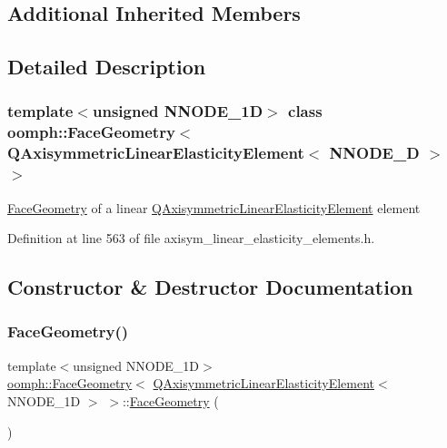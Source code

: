 \subsection*{Additional Inherited Members}


\subsection{Detailed Description}
\subsubsection*{template$<$unsigned N\+N\+O\+D\+E\+\_\+1D$>$\newline
class oomph\+::\+Face\+Geometry$<$ Q\+Axisymmetric\+Linear\+Elasticity\+Element$<$ N\+N\+O\+D\+E\+\_\+D $>$ $>$}

\hyperlink{classoomph_1_1FaceGeometry}{Face\+Geometry} of a linear \hyperlink{classoomph_1_1QAxisymmetricLinearElasticityElement}{Q\+Axisymmetric\+Linear\+Elasticity\+Element} element 

Definition at line 563 of file axisym\+\_\+linear\+\_\+elasticity\+\_\+elements.\+h.



\subsection{Constructor \& Destructor Documentation}
\mbox{\label{classoomph_1_1FaceGeometry_3_01QAxisymmetricLinearElasticityElement_3_01NNODE__1D_01_4_01_4_ab21305bb47d99ed60198556c06a856a7}} 
\subsubsection{\texorpdfstring{Face\+Geometry()}{FaceGeometry()}}
{\footnotesize\ttfamily template$<$unsigned N\+N\+O\+D\+E\+\_\+1D$>$ \\
\hyperlink{classoomph_1_1FaceGeometry}{oomph\+::\+Face\+Geometry}$<$ \hyperlink{classoomph_1_1QAxisymmetricLinearElasticityElement}{Q\+Axisymmetric\+Linear\+Elasticity\+Element}$<$ N\+N\+O\+D\+E\+\_\+1D $>$ $>$\+::\hyperlink{classoomph_1_1FaceGeometry}{Face\+Geometry} (\begin{DoxyParamCaption}{ }\end{DoxyParamCaption})\hspace{0.3cm}{\ttfamily [inline]}}



